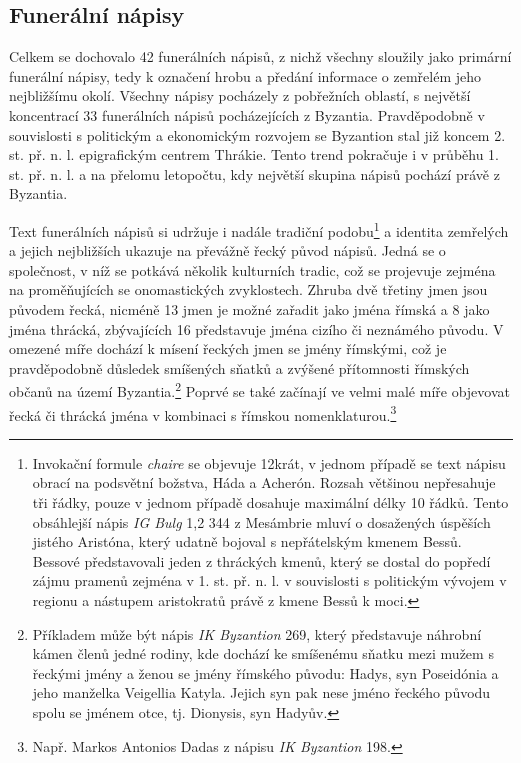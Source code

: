 \subsection[funerální-nápisy-9]{Funerální nápisy}

Celkem se dochovalo 42 funerálních nápisů, z nichž všechny sloužily jako primární funerální nápisy, tedy k označení hrobu a předání informace o zemřelém jeho nejbližšímu okolí. Všechny nápisy pocházely z pobřežních oblastí, s největší koncentrací 33 funerálních nápisů pocházejících z Byzantia. Pravděpodobně v souvislosti s politickým a ekonomickým rozvojem se Byzantion stal již koncem 2. st. př. n. l. epigrafickým centrem Thrákie. Tento trend pokračuje i v průběhu 1. st. př. n. l. a na přelomu letopočtu, kdy největší skupina nápisů pochází právě z Byzantia.

Text funerálních nápisů si udržuje i nadále tradiční podobu\footnote{Invokační formule {\em chaire} se objevuje 12krát, v jednom případě se text nápisu obrací na podsvětní božstva, Háda a Acherón. Rozsah většinou nepřesahuje tři řádky, pouze v jednom případě dosahuje maximální délky 10 řádků. Tento obsáhlejší nápis {\em IG Bulg} 1,2 344 z Mesámbrie mluví o dosažených úspěších jistého Aristóna, který udatně bojoval s nepřátelským kmenem Bessů. Bessové představovali jeden z thráckých kmenů, který se dostal do popředí zájmu pramenů zejména v 1. st. př. n. l. v souvislosti s politickým vývojem v regionu a nástupem aristokratů právě z kmene Bessů k moci.} a identita zemřelých a jejich nejbližších ukazuje na převážně řecký původ nápisů. Jedná se o společnost, v níž se potkává několik kulturních tradic, což se projevuje zejména na proměňujících se onomastických zvyklostech. Zhruba dvě třetiny jmen jsou původem řecká, nicméně 13  jmen je možné zařadit jako jména římská a 8  jako jména thrácká, zbývajících 16  představuje jména cizího či neznámého původu. V omezené míře dochází k mísení řeckých jmen se jmény římskými, což je pravděpodobně důsledek smíšených sňatků a zvýšené přítomnosti římských občanů na území Byzantia.\footnote{Příkladem může být nápis {\em IK Byzantion} 269, který představuje náhrobní kámen členů jedné rodiny, kde dochází ke smíšenému sňatku mezi mužem s řeckými jmény a ženou se jmény římského původu: Hadys, syn Poseidónia a jeho manželka Veigellia Katyla. Jejich syn pak nese jméno řeckého původu spolu se jménem otce, tj. Dionysis, syn Hadyův.} Poprvé se také začínají ve velmi malé míře objevovat řecká či thrácká jména v kombinaci s římskou nomenklaturou.\footnote{Např. Markos Antonios Dadas z nápisu {\em IK Byzantion} 198.}

